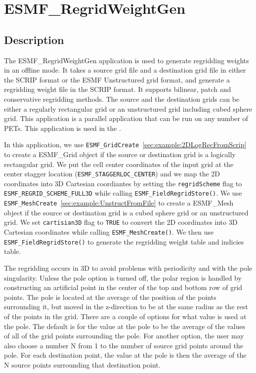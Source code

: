 
\section{ESMF\_RegridWeightGen}
\label{sec:ESMF_RegridWeightGen}

\subsection{Description}

The ESMF\_RegridWeightGen application is used to generate regridding weights in an offline mode.
It takes a source grid file and a destination grid file
in either the SCRIP format or the ESMF Unstructured grid format, and generate a regridding weight 
file in the SCRIP format.  It supports bilinear, patch and conservative regridding methods.  
The source and the destination grids can be either a regularly rectangular grid or an unstructured grid
including cubed sphere grid.  This application is a parallel application that can be run 
on any number of PETs.  This application is used in the .

In this application, we use {\tt ESMF\_GridCreate}~\ref{sec:example:2DLogRecFromScrip} to create a 
ESMF\_Grid object if the source or destination grid is a logically rectangular grid.  We put the cell center 
coordinates of the input grid at the center stagger location ({\tt ESMF\_STAGGERLOC\_CENTER}) and we map the 2D coordinates
into 3D Cartesian coordiantes by setting the {\tt regridScheme} flag to {\tt ESMF\_REGRID\_SCHEME\_FULL3D} while calling 
{\tt ESMF\_FieldRegridStore()}.   We use 
{\tt ESMF\_MeshCreate}~\ref{sec:example:UnstructFromFile} to create a ESMF\_Mesh object if the 
source or destination grid is a cubed sphere grid or an unstructured grid. We set {\tt cartisian3D} flag to {\tt TRUE} to
convert the 2D coordinates into 3D Cartesian coordinates while calling {\tt ESMF\_MeshCreate()}. We then use
{\tt ESMF\_FieldRegridStore()} to generate the regridding weight table and indicies table.   

The regridding occurs in 3D to avoid
problems with periodicity and with the pole singularity. 
Unless the pole option is turned off, the polar region is handled by constructing 
an artificial point in the center of the top and bottom row of grid points. 
The pole is located at the average of the position of the points surrounding
it, but moved in the z-direction to be at the same radius as the rest of the points
in the grid. There are a couple of options for what value is used at the pole. 
The default is for the value at the pole to be the average of the values
of all of the grid points surrounding the pole. For another option, the user may also choose
a number N from 1 to the number of source grid points around the pole. For
each destination point, the value at the pole is then the average of the N source points
surrounding that destination point.

